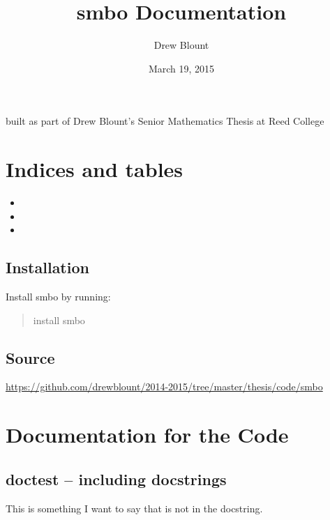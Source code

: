 \documentclass[letterpaper,10pt,english]{sphinxmanual}
\title{smbo Documentation}
\date{March 19, 2015}
\author{Drew Blount}
\begin{document}
\maketitle
\tableofcontents
{}\label{index::doc}


built as part of Drew Blount's Senior Mathematics Thesis at Reed College
\label{index:module-smbo}

\chapter{Indices and tables}
\label{index:indices-and-tables}\label{index:smbo-a-tool-for-sequential-model-based-optimization}\begin{itemize}
\item {} 

\item {} 

\item {} 

\end{itemize}


\section{Installation}
\label{index:installation}
Install smbo by running:
\begin{quote}

install smbo
\end{quote}


\section{Source}
\label{index:source}
\href{https://github.com/drewblount/2014-2015/tree/master/thesis/code/smbo}{https://github.com/drewblount/2014-2015/tree/master/thesis/code/smbo}


\chapter{Documentation for the Code}
\label{index:documentation-for-the-code}

\section{doctest -- including docstrings}
\label{index:doctest-including-docstrings}
This is something I want to say that is not in the docstring.
\end{document}
